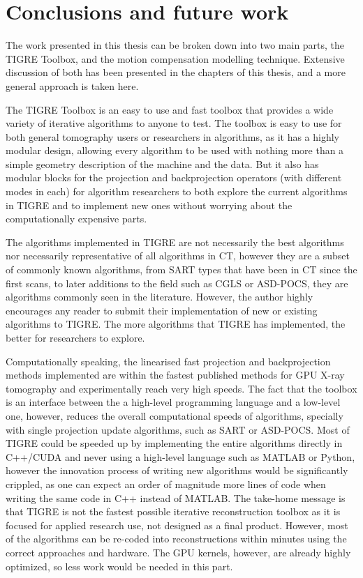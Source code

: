 \chapter{Conclusions and future work}

The work presented in this thesis can be broken down into two main parts, the TIGRE Toolbox, and the motion compensation modelling technique. Extensive discussion of both has been presented in the chapters of this thesis, and a more general approach is taken here. 

The TIGRE Toolbox is an easy to use and fast toolbox that provides a wide variety of iterative algorithms to anyone to test. The toolbox is easy to use for both general tomography users or researchers in algorithms, as it has a highly modular design, allowing every algorithm to be used with nothing more than a simple geometry description of the machine and the data. But it also has modular blocks for the projection and backprojection operators (with different modes in each) for algorithm researchers to both explore the current algorithms in TIGRE and to implement new ones without worrying about the computationally expensive parts. 

The algorithms implemented in TIGRE are not necessarily the best algorithms nor necessarily representative of all algorithms in CT, however they are a subset of commonly known algorithms, from SART types that have been in CT since the first scans, to later additions to the field such as CGLS or ASD-POCS, they are algorithms commonly seen in the literature. However, the author highly encourages any reader to submit their implementation of new or existing algorithms to TIGRE. The more algorithms that TIGRE has implemented, the better for researchers to explore.

Computationally speaking, the linearised fast projection and backprojection methods implemented are within the fastest published methods for GPU X-ray tomography and experimentally reach very high speeds. The fact that the toolbox is an interface between the a high-level programming language and a low-level one, however, reduces the overall computational speeds of algorithms, specially with single projection update algorithms, such as SART or ASD-POCS. Most of TIGRE could be speeded up by implementing the entire algorithms directly in C++/CUDA and never using a high-level language such as MATLAB or Python, however the innovation process of writing new algorithms would be significantly crippled, as one can expect an order of magnitude more lines of code when writing the same code in C++ instead of MATLAB. The take-home message is that TIGRE is not the fastest possible iterative reconstruction toolbox as it is focused for applied research use, not designed as a final product. However, most of the algorithms can be re-coded into reconstructions within minutes using the correct approaches and hardware. The GPU kernels, however, are already highly optimized, so less work would be needed in this part.

